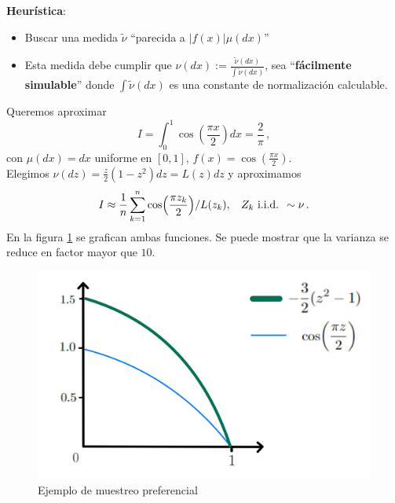 \newp \textbf{Heurística}:
\begin{itemize}
    \item Buscar una medida $\tilde{\nu}$ ``parecida a $|f(x)|\mu(dx)$''
    \item Esta medida debe cumplir que $\nu(dx):=\displaystyle\frac{\tilde\nu(dx)}{\int\tilde{\nu}(dx)}$, sea ``\textbf{fácilmente simulable}'' donde $\int\tilde{\nu}(dx)$ es una constante de normalización calculable. 
\end{itemize}
\begin{example}
Queremos aproximar $$I=\displaystyle\int^1_0\cos(\frac{\pi x}{2})dx=\frac{2}{\pi} \, ,$$ con $\mu(dx)=dx$ uniforme en $[0,1]$, $f(x)=\cos(\frac{\pi x}{2})$.\\
\newline Elegimos $\nu(dz)=\frac{z}{2}(1-z^2)dz=L(z)dz$ y aproximamos
$$ I\approx\displaystyle\frac{1}{n}\sum^n_{k=1}\cos(\frac{\pi z_k}{2})/L(z_k), \hspace{.25cm}\, Z_k \mbox{ i.i.d. } \sim \nu \, .$$
En la figura \ref{fig:pref} se grafican ambas funciones. Se puede mostrar que la varianza se reduce en factor mayor que $10$.
\begin{figure}
    \centering
    \includegraphics[scale=0.12]{img/clase_08_pag_11.jpg}
    \caption{Ejemplo de muestreo preferencial}
    \label{fig:pref}
\end{figure}
\end{example}

